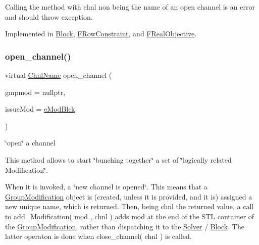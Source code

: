 Calling the method with chnl non being the name of an open channel is an error and should throw exception. 

Implemented in \mbox{\hyperlink{class_s_m_spp__di__unipi__it_1_1_block_ae8c20577eae73143d71b37b1550c1e93}{Block}}, \mbox{\hyperlink{class_s_m_spp__di__unipi__it_1_1_f_row_constraint_ae8c20577eae73143d71b37b1550c1e93}{F\+Row\+Constraint}}, and \mbox{\hyperlink{class_s_m_spp__di__unipi__it_1_1_f_real_objective_ae8c20577eae73143d71b37b1550c1e93}{F\+Real\+Objective}}.

\mbox{\label{class_s_m_spp__di__unipi__it_1_1_observer_acf7e46d450779f524e3655c5f31eecc8}} 
\subsubsection{\texorpdfstring{open\+\_\+channel()}{open\_channel()}}
{\footnotesize\ttfamily virtual \mbox{\hyperlink{class_s_m_spp__di__unipi__it_1_1_observer_a54ce8db639626e45b1f20c289baa989b}{Chnl\+Name}} open\+\_\+channel (\begin{DoxyParamCaption}\item[{\mbox{\hyperlink{class_s_m_spp__di__unipi__it_1_1_group_modification}{Group\+Modification}} $\ast$}]{gmpmod = {\ttfamily nullptr},  }\item[{\mbox{\hyperlink{group___modification___t_y_p_e_s_ga544246d8c462e9a2d817c2c30797968f}{c\+\_\+\+Mod\+Param}}}]{issue\+Mod = {\ttfamily \mbox{\hyperlink{group___modification___t_y_p_e_s_gga48fddcdd03a03f49b7e389ca1ed938d4a21b14b26b1c0093a0905f6fc010bad29}{e\+Mod\+Blck}}} }\end{DoxyParamCaption})\hspace{0.3cm}{\ttfamily [pure virtual]}}



\char`\"{}open\char`\"{} a channel 

This method allows to start \char`\"{}bunching together\char`\"{} a set of \char`\"{}logically
related Modification\char`\"{}.

When it is invoked, a \char`\"{}new channel is opened\char`\"{}. This means that a \mbox{\hyperlink{class_s_m_spp__di__unipi__it_1_1_group_modification}{Group\+Modification}} object is (created, unless it is provided, and it is) assigned a new unique name, which is returned. Then, being chnl the returned value, a call to add\+\_\+\+Modification( mod , chnl ) adds mod at the end of the S\+TL container of the \mbox{\hyperlink{class_s_m_spp__di__unipi__it_1_1_group_modification}{Group\+Modification}}, rather than dispatching it to the \mbox{\hyperlink{class_s_m_spp__di__unipi__it_1_1_solver}{Solver}} / \mbox{\hyperlink{class_s_m_spp__di__unipi__it_1_1_block}{Block}}. The latter operaton is done when close\+\_\+channel( chnl ) is called.

